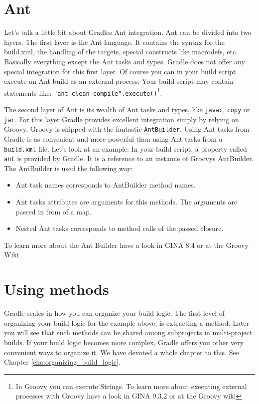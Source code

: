 \section{Ant}
Let's talk a little bit about Gradles Ant integration. Ant can be divided into two layers. The first layer is the Ant language. It contains the syntax for the build.xml, the handling of the targets, special constructs like macrodefs, etc. Basically everything except the Ant tasks and types. Gradle does not offer any special integration for this first layer. Of course you can in your build script execute an Ant build as an external process. Your build script may contain statements like: \texttt{"ant clean compile".execute()}\footnote{In Groovy you can execute Strings. To learn more about executing external processes with Groovy have a look in GINA 9.3.2 or at the Groovy wiki}.

The second layer of Ant is its wealth of Ant tasks and types, like \texttt{javac}, \texttt{copy} or \texttt{jar}. For this layer Gradle provides excellent integration simply by relying on Groovy. Groovy is shipped with the fantastic \texttt{AntBuilder}. Using Ant tasks from Gradle is as convenient and more powerful than using Ant tasks from a \texttt{build.xml} file. Let's look at an example:
In your build script, a property called \texttt{ant} is provided by Gradle. It is a reference to an instance of Groovys AntBuilder. The AntBuilder is used the following way:
\begin{itemize}
\item Ant task names corresponds to AntBuilder method names.
\item Ant tasks attributes are arguments for this methods. The arguments are passed in from of a map.
\item Nested Ant tasks corresponds to method calls of the passed closure.
\end{itemize}
To learn more about the Ant Builder have a look in GINA 8.4 or at the Groovy Wiki

\section{Using methods}
Gradle scales in how you can organize your build logic. The first level of organizing your build logic for the example above, is extracting a method.
Later you will see that such methods can be shared among subprojects in multi-project builds. If your build logic becomes more complex, Gradle offers you other very convenient ways to organize it. We have devoted a whole chapter to this. See Chapter \ref{cha:organizing_build_logic}. 

